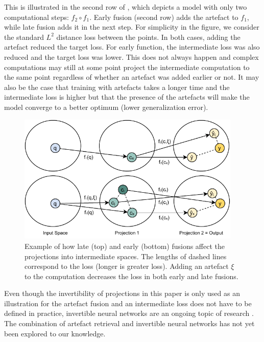 This is illustrated in the second row of , which depicts a model with only two computational steps: $f_2 \circ f_1$. 
Early fusion (second row) adds the artefact to $f_1$, while late fusion adds it in the next step.
For simplicity in the figure, we consider the standard $L^2$ distance loss between the points.
In both cases, adding the artefact reduced the target loss. For early function, the intermediate loss was also reduced and the target loss was lower.
This does not always happen and complex computations may still at some point project the intermediate computation to the same point regardless of whether an artefact was added earlier or not.
It may also be the case that training with artefacts takes a longer time and the intermediate loss is higher but that the presence of the artefacts will make the model converge to a better optimum (lower generalization error).

\begin{figure}[ht]
    \center
    \includegraphics[width=0.95\textwidth]{img/computation_projection.pdf}
    \caption{Example of how late (top) and early (bottom) fusions affect the projections into intermediate spaces. The lengths of dashed lines correspond to the loss (longer is greater loss). Adding an artefact $\xi$ to the computation decreases the loss in both early and late fusions.}
    \label{fig:computation_projection}
\end{figure}

Even though the invertibility of projections in this paper is only used as an illustration for the artefact fusion and an intermediate loss does not have to be defined in practice, invertible neural networks are an ongoing topic of research \cite{ardizzone2018analyzing, behrmann2020understanding}.
The combination of artefact retrieval and invertible neural networks has not yet been explored to our knowledge.